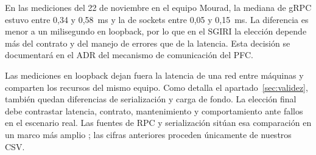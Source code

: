En las mediciones del 22 de noviembre en el equipo Mourad, la mediana
de gRPC estuvo entre 0,34 y 0,58~ms y la de sockets entre 0,05 y
0,15~ms. La diferencia es menor a un milisegundo en loopback, por lo
que en el SGIRI la elección depende más del contrato y del manejo de
errores que de la latencia. Esta decisión se documentará en el ADR del
mecanismo de comunicación del PFC.

Las mediciones en loopback dejan fuera la latencia de una red entre
máquinas y comparten los recursos del mismo equipo. Como detalla
el apartado~\ref{sec:validez}, también quedan diferencias de
serialización y carga de fondo. La elección final debe contrastar
latencia, contrato, mantenimiento y comportamiento ante fallos en el
escenario real. Las fuentes de RPC y serialización sitúan esa comparación
en un marco más amplio \cite{blinowski2026rpc,jackson2024streaming};
las cifras anteriores proceden únicamente de nuestros CSV.
